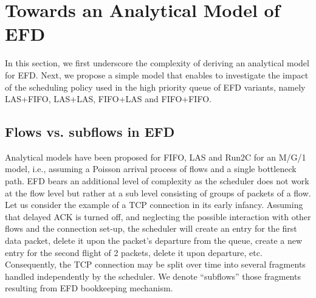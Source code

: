 \documentclass[preprint,12pt]{elsarticle}
\begin{document}
\section{Towards an Analytical Model of EFD}
\label{sec:analysis_efd}

In this section, we first underscore the complexity of deriving an analytical model for EFD. Next, we propose a simple model that enables to investigate the impact of the scheduling policy used in the high priority queue of EFD variants, namely LAS+FIFO, LAS+LAS, FIFO+LAS and FIFO+FIFO. 

\subsection{Flows vs. subflows in EFD}
Analytical models have been proposed for FIFO, LAS and Run2C \cite{kleinrock_76_queueing,Avrachenkov04Run2c,Rai04performancemodels} for an M/G/1 model, i.e., assuming a Poisson arrival process of flows and a single bottleneck path. EFD bears an additional level of complexity as the scheduler does not work at the flow level but rather at a sub level consisting of groups of packets of a flow.
Let us consider the example of a TCP connection in its early infancy. Assuming that  delayed ACK is turned off, and neglecting the possible interaction with other flows and the connection set-up, the scheduler will create an entry for the first data packet, delete it upon the packet's departure from the queue, create a new entry for the second flight of 2 packets, delete it upon departure, etc. Consequently, the TCP connection may be split over time into several fragments handled independently by the scheduler. We denote ``subflows'' those fragments resulting from EFD bookkeeping mechanism. %




\end{document}
